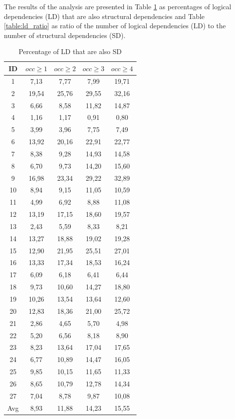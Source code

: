 \documentclass[conference]{IEEEtran}
\begin{document}
The results of the analysis are presented in Table \ref{table:sd_percentages} as percentages of logical dependencies (LD) that are also structural dependencies and Table \ref{table:ld_ratio} as ratio of the number of logical dependencies (LD) to the number of structural dependencies (SD).



\begin{table}[!h]
\renewcommand{\arraystretch}{1.25}
\caption{Percentage of LD that are also SD}
\label{table:sd_percentages}
\centering
\begin{tabular}{|c|c|c|c|c|}
\hline
    ID  & $occ\geq 1$ & $occ\geq 2$ & $occ\geq 3$ & $occ\geq 4$  \\
\hline
1	&	7,13	&	7,77	&	7,99	&	19,71	\\
2	&	19,54	&	25,76	&	29,55	&	32,16	\\
3	&	6,66	&	8,58	&	11,82	&	14,87	\\
4	&	1,16	&	1,17	&	0,91	&	0,80	\\
5	&	3,99	&	3,96	&	7,75	&	7,49	\\
6	&	13,92	&	20,16	&	22,91	&	22,77	\\
7	&	8,38	&	9,28	&	14,93	&	14,58	\\
8	&	6,70	&	9,73	&	14,20	&	15,60	\\
9	&	16,98	&	23,34	&	29,22	&	32,89	\\
10	&	8,94	&	9,15	&	11,05	&	10,59	\\
11	&	4,99	&	6,92	&	8,88	&	11,08	\\
12	&	13,19	&	17,15	&	18,60	&	19,57	\\
13	&	2,43	&	5,59	&	8,33	&	8,21	\\
14	&	13,27	&	18,88	&	19,02	&	19,28	\\
15	&	12,90	&	21,95	&	25,51	&	27,01	\\
16	&	13,33	&	17,34	&	18,53	&	16,24	\\
17	&	6,09	&	6,18	&	6,41	&	6,44	\\
18	&	9,73	&	10,60	&	14,27	&	18,80	\\
19	&	10,26	&	13,54	&	13,64	&	12,60	\\
20	&	12,83	&	18,36	&	21,00	&	25,72	\\
21	&	2,86	&	4,65	&	5,70	&	4,98	\\
22	&	5,20	&	6,56	&	8,18	&	8,90	\\
23	&	8,23	&	13,64	&	17,04	&	17,65	\\
24	&	6,77	&	10,89	&	14,47	&	16,05	\\
25	&	9,85	&	10,15	&	11,65	&	11,33	\\
26	&	8,65	&	10,79	&	12,78	&	14,34	\\
27	&	7,04	&	8,78	&	9,87	&	10,08	\\
\hline
Avg	&	8,93	&	11,88	&	14,23	&	15,55	\\
\hline
\end{tabular}
\end{table}
\end{document}

